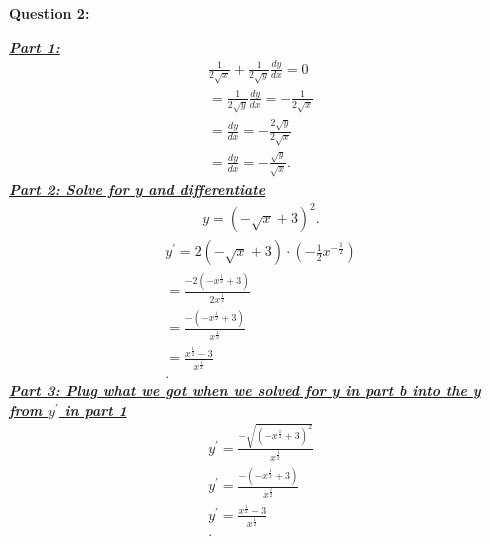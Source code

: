 \documentclass{report}
\begin{document}
    \bigbreak \noindent \bigbreak \noindent 
    \begin{Large}
        \textbf{Question 2:}
    \end{Large}
    \bigbreak \noindent 
    \bigbreak \noindent 
    \textbf{\textit{\underline{Part 1:}}}
    \begin{align*}
      \frac{1}{2\sqrt{x}} + \frac{1}{2\sqrt{y}}\frac{dy}{dx} = 0  \\
      =\frac{1}{2\sqrt{y}}\frac{dy}{dx} = - \frac{1}{2\sqrt{x}} \\
      = \frac{dy}{dx}= -\frac{2\sqrt{y}}{2\sqrt{x}} \\
      = \frac{dy}{dx}= -\frac{\sqrt{y}}{\sqrt{x}} 
    .\end{align*}
    \bigbreak \noindent 
    \textbf{\textit{\underline{Part 2: Solve for y and differentiate}}}
    \begin{align*}
      y = (-\sqrt{x}+3)^{2}
    .\end{align*}
    \begin{align*}
      y^{\prime} = 2(-\sqrt{x}+3) \cdot (-\frac{1}{2}x^{-\frac{1}{2}}) \\ 
      = \frac{-2(-x^{\frac{1}{2}} + 3)}{2x^{\frac{1}{2}}} \\
      = \frac{-(-x^{\frac{1}{2}}+ 3)}{x^{\frac{1}{2}}} \\ 
      = \frac{x^{\frac{1}{2}}- 3}{x^{\frac{1}{2}}} \\ 
    .\end{align*}
    \bigbreak \noindent 
    \textbf{\textit{\underline{Part 3: Plug what we got when we solved for y in part b into the y from $y^{\prime}$ in part 1 }}}
    \begin{align*}
      y^{\prime} = \frac{-\sqrt{(-x^{\frac{1}{2}}+3)^{2}}}{x^{\frac{1}{2}}} \\
      y^{\prime} = \frac{-(-x^{\frac{1}{2}}+3)}{x^{\frac{1}{2}}} \\
      y^{\prime} = \frac{x^{\frac{1}{2}}-3}{x^{\frac{1}{2}}} \\
    .\end{align*}
\end{document}
